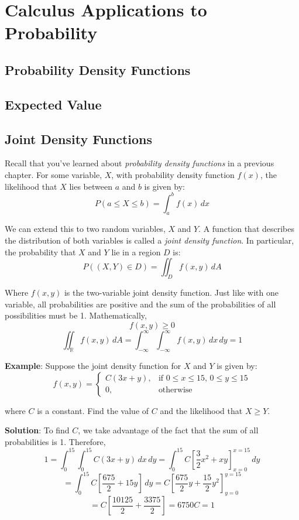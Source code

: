 \chapter{Calculus Applications to Probability}

\section{Probability Density Functions}

\section{Expected Value}

\section{Joint Density Functions}
Recall that you've learned about \textit{probability density functions} in a 
previous chapter. For some variable, $X$, with probability density function 
$f(x)$, the likelihood that $X$ lies between $a$ and $b$ is given by:
$$P(a \leq X \leq b) = \int_a^b f(x)\,dx$$

We can extend this to two random variables, $X$ and $Y$. A function that 
describes the distribution of both variables is called a \textit{joint 
density function}. In particular, the probability
that $X$ and $Y$ lie in a region $D$ is:
$$P((X, Y) \in D) = \iint_{\textit{D}} f(x,y)\,dA$$

Where $f(x, y)$ is the two-variable joint density function. Just like with one 
variable, all probabilities are positive and the sum of the probabilities of 
all possibilities must be 1. Mathematically, 
$$f(x, y) \geq 0$$
$$\iint_{\mathbb{R}} f(x, y)\,dA = \int_{-\infty}^{\infty} \int_{-\infty}^{
\infty} f(x, y)\,dx\,dy = 1$$

\textbf{Example}: Suppose the joint density function for $X$ and $Y$ is given 
by:
$$f(x, y) = 
\begin{cases}
C(3x + y),& \text{if }0 \leq x \leq 15\text{, }0 \leq y \leq 15\\
0,&\text{otherwise}
\end{cases}
$$

where $C$ is a constant. Find the value of $C$ and the likelihood that $X \geq 
Y$.

\textbf{Solution}: To find $C$, we take advantage of the fact that the sum of 
all probabilities is 1. Therefore,
$$1 = \int_0^{15} \int_0^{15} C(3x + y)\,dx\,dy = \int_0^{15} C \left[ \frac{3
}{2}x^2 + xy \right]_{x = 0}^{x = 15}\,dy$$
$$= \int_0^{15} C \left[ \frac{675}{2} + 15y \right]\,dy = C \left[ \frac{675}{
2}y + \frac{15}{2}y^2 \right]_{y = 0}^{y = 15}$$
$$= C \left[ \frac{10125}{2} + \frac{3375}{2} \right] = 6750C = 1$$

